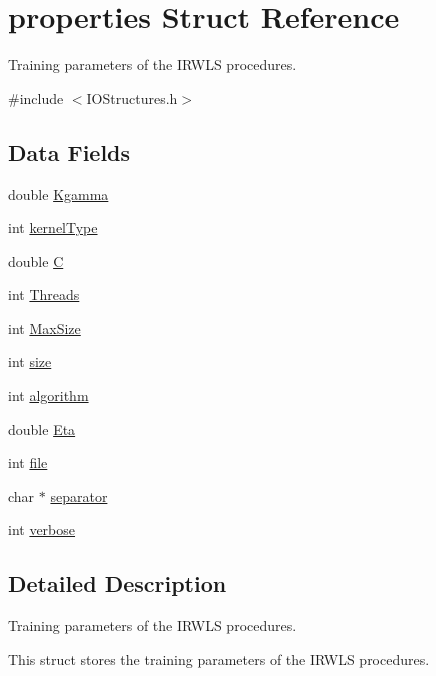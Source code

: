 \hypertarget{structproperties}{}\section{properties Struct Reference}
\label{structproperties}


Training parameters of the I\+R\+W\+LS procedures.  




{\ttfamily \#include $<$I\+O\+Structures.\+h$>$}

\subsection*{Data Fields}
\begin{DoxyCompactItemize}
\item 
double \hyperlink{structproperties_aab9c0195a446f08fc782701750ddb6ac}{Kgamma}
\item 
int \hyperlink{structproperties_a2cb295bd30c81b5bec52b79e67106881}{kernel\+Type}
\item 
double \hyperlink{structproperties_a3b98814395b295db30f029e5e67ae9c9}{C}
\item 
int \hyperlink{structproperties_a56ab77c44fb808e71990074bd75529ed}{Threads}
\item 
int \hyperlink{structproperties_a42219768dd35e1ab628e1785759df400}{Max\+Size}
\item 
int \hyperlink{structproperties_a1694aebbbdd904f9b0e5faca725966b6}{size}
\item 
int \hyperlink{structproperties_aa0ba665a115d2e69811c694bc1af5096}{algorithm}
\item 
double \hyperlink{structproperties_abd91deb543a31a6a1f75892af7cf95c8}{Eta}
\item 
int \hyperlink{structproperties_a184d36a53db3e72b771bde8bd8e782f9}{file}
\item 
char $\ast$ \hyperlink{structproperties_a0d357070dcbbf50ac0a7ef0fdeaad80a}{separator}
\item 
int \hyperlink{structproperties_a641ab2809e565e16086ee64e924cbd63}{verbose}
\end{DoxyCompactItemize}


\subsection{Detailed Description}
Training parameters of the I\+R\+W\+LS procedures. 

This struct stores the training parameters of the I\+R\+W\+LS procedures. 

